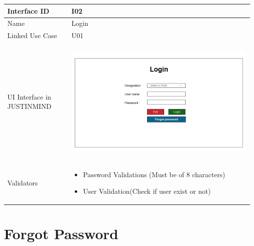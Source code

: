 \documentclass[12pt,a4paper]{report}
\begin{document}
\begin{tabular}{ | m{3cm} | m{12cm}| } \hline

Interface ID & I02  \\\hline

Name  	      & Login  \\ \hline

Linked Use Case & U01 \\ \hline

UI Interface in JUSTINMIND & \begin{center} \includegraphics[scale=0.3]{./User Interface/UI-002 Login@1x.png}\end{center}  \\ \hline

Validators & 
\begin{itemize}
\item   Password Validations (Must be of 8 characters)
\item   User Validation(Check if user exist or not)

\end{itemize}
\\ \hline

\end{tabular} 
\section{Forgot Password }
\end{document}
